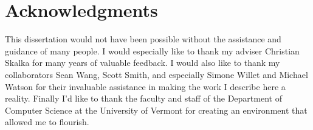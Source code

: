 

\chapter*{Acknowledgments} 

\doublespace

This dissertation would not have been possible without the assistance and guidance of many
people. I would especially like to thank my adviser Christian Skalka for many years of valuable
feedback. I would also like to thank my collaborators Sean Wang, Scott Smith, and especially
Simone Willet and Michael Watson for their invaluable assistance in making the work I describe
here a reality. Finally I'd like to thank the faculty and staff of the Department of Computer
Science at the University of Vermont for creating an environment that allowed me to flourish.

\primaryspacing
